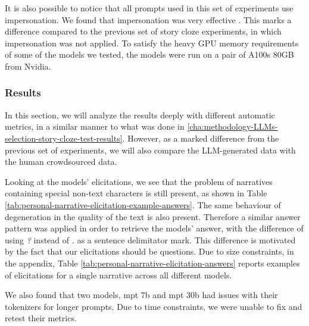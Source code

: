 It is also possible to notice that all prompts used in this set of experiments use impersonation. We found that impersonation was very effective \cite{impersonation}. This marks a difference compared to the previous set of story cloze experiments, in which impersonation was not applied.
To satisfy the heavy GPU memory requirements of some of the models we tested, the models were run on a pair of A100s 80GB from Nvidia.
\subsubsection{Results}
\label{cha:methodology-personal-narrative-elicitation-results}
In this section, we will analyze the results deeply with different automatic metrics, in a similar manner to what was done in \ref{cha:methodology-LLMs-selection-story-cloze-test-results}. However, as a marked difference from the previous set of experiments, we will also compare the LLM-generated data with the human crowdsourced data.


Looking at the models' elicitations, we see that the problem of narratives containing special non-text characters is still present, as shown in Table \ref{tab:personal-narrative-elicitation-example-answers}. The same behaviour of degeneration in the quality of the text is also present. Therefore a similar answer pattern was applied in order to retrieve the models' answer, with the difference of using \emph{?} instead of \emph{.} as a sentence delimitator mark. This difference is motivated by the fact that our elicitations should be questions.
% 
Due to size constraints, in the appendix, Table \ref{tab:personal-narrative-elicitation-answers} reports examples of elicitations for a single narrative across all different models. %

We also found that two models, mpt 7b and mpt 30b had issues with their tokenizers for longer prompts. Due to time constraints, we were unable to fix and retest their metrics.

